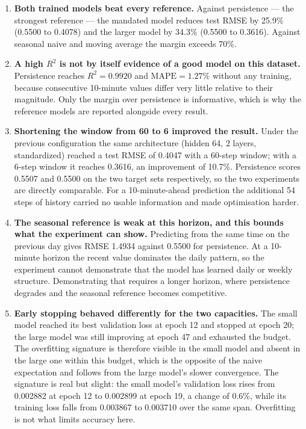 \documentclass[11pt,a4paper]{article}
\begin{document}
\begin{enumerate}
  \item \textbf{Both trained models beat every reference.} Against persistence --- the strongest
        reference --- the mandated model reduces test RMSE by 25.9\% (0.5500 to 0.4078) and the
        larger model by 34.3\% (0.5500 to 0.3616). Against seasonal naive and moving average the
        margin exceeds 70\%.

  \item \textbf{A high $R^2$ is not by itself evidence of a good model on this dataset.}
        Persistence reaches $R^2 = 0.9920$ and $\mathrm{MAPE} = 1.27\%$ without any training,
        because consecutive 10-minute values differ very little relative to their magnitude. Only
        the margin over persistence is informative, which is why the reference models are reported
        alongside every result.

  \item \textbf{Shortening the window from 60 to 6 improved the result.} Under the previous
        configuration the same architecture (hidden 64, 2 layers, standardized) reached a test RMSE
        of 0.4047 with a 60-step window; with a 6-step window it reaches 0.3616, an improvement of
        10.7\%. Persistence scores 0.5507 and 0.5500 on the two target sets respectively, so the
        two experiments are directly comparable. For a 10-minute-ahead prediction the additional 54
        steps of history carried no usable information and made optimisation harder.

  \item \textbf{The seasonal reference is weak at this horizon, and this bounds what the
        experiment can show.} Predicting from the same time on the previous day gives RMSE 1.4934
        against 0.5500 for persistence. At a 10-minute horizon the recent value dominates the daily
        pattern, so the experiment cannot demonstrate that the model has learned daily or weekly
        structure. Demonstrating that requires a longer horizon, where persistence degrades and the
        seasonal reference becomes competitive.

  \item \textbf{Early stopping behaved differently for the two capacities.} The small model reached
        its best validation loss at epoch 12 and stopped at epoch 20; the large model was still
        improving at epoch 47 and exhausted the budget. The overfitting signature is therefore
        visible in the small model and absent in the large one within this budget, which is the
        opposite of the naive expectation and follows from the large model's slower convergence.
        The signature is real but slight: the small model's validation loss rises from 0.002882 at
        epoch 12 to 0.002899 at epoch 19, a change of 0.6\%, while its training loss falls from
        0.003867 to 0.003710 over the same span. Overfitting is not what limits accuracy here.


\end{enumerate}
\end{document}
